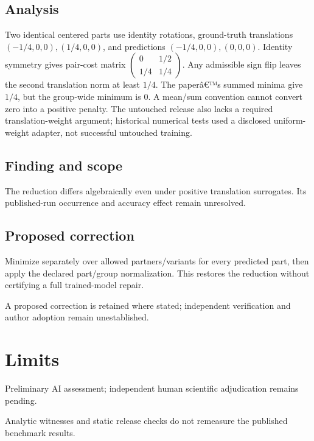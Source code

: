 \documentclass[11pt]{article}
\begin{document}
\subsection*{Analysis}

Two identical centered parts use identity rotations, ground-truth translations \((-1/4,0,0),(1/4,0,0)\), and predictions \((-1/4,0,0),(0,0,0)\). Identity symmetry gives pair-cost matrix \(\begin{pmatrix}0&1/2\\1/4&1/4\end{pmatrix}\). Any admissible sign flip leaves the second translation norm at least \(1/4\). The paperâ€™s summed minima give \(1/4\), but the group-wide minimum is \(0\). A mean/sum convention cannot convert zero into a positive penalty. The untouched release also lacks a required translation-weight argument; historical numerical tests used a disclosed uniform-weight adapter, not successful untouched training.

\subsection*{Finding and scope}

The reduction differs algebraically even under positive translation surrogates. Its published-run occurrence and accuracy effect remain unresolved.

\subsection*{Proposed correction}

Minimize separately over allowed partners/variants for every predicted part, then apply the declared part/group normalization. This restores the reduction without certifying a full trained-model repair.

A proposed correction is retained where stated; independent verification and author adoption remain unestablished.

\section*{Limits}

Preliminary AI assessment; independent human scientific adjudication remains pending.\par

Analytic witnesses and static release checks do not remeasure the published benchmark results.\par
\end{document}
